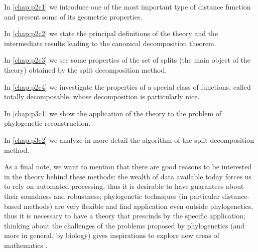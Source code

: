 \documentclass[./main.tex]{subfiles}
\begin{document}
\begin{FlushLeft}\setlength{\parskip}{0pt}%
In \autoref{chap:p2c1} we introduce one of the most important type of distance function and present some of its geometric properties. \par{}%
In \autoref{chap:p2c2} we state the principal definitions of the theory and the intermediate results leading to the canonical decomposition theorem. \par{}%
In \autoref{chap:p2c3} we see some properties of the set of splits (the main object of the theory) obtained by the split decomposition method. \par{}%
In \autoref{chap:p2c4} we investigate the properties of a special class of functions, called totally decomposable, whose decomposition is particularly nice. \par{}%
In \autoref{chap:p3c1} we show the application of the theory to the problem of phylogenetic reconstruction. \par{}%
In \autoref{chap:p3c2} we analyze in more detail the algorithm of the split decomposition method.
\end{FlushLeft}

\clearpage

As a final note, we want to mention that there are good reasons to be interested in the theory behind these methods: the wealth of data available today forces us to rely on automated processing, thus it is desirable to have guarantees about their soundness and robustness; phylogenetic techniques (in particular distance-based methods) are very flexible and find application even outside phylogenetics, thus it is necessary to have a theory that prescinds by the specific application; thinking about the challenges of the problems proposed by phylogenetics (and more in general, by biology) gives inspirations to explore new areas of mathematics \cite{Coh04,Stu05}.\bigskip
\end{document}
